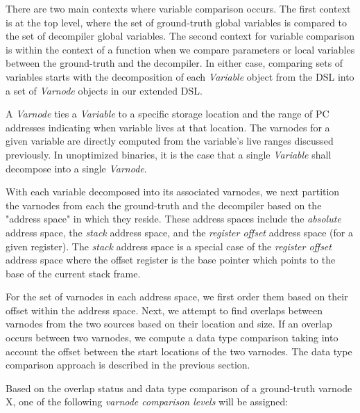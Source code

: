 \documentclass[conference]{IEEEtran}
\begin{document}
There are two main contexts where variable comparison occurs. The first context is at the top level, where the set of ground-truth global variables is compared to the set of decompiler global variables. The second context for variable comparison is within the context of a function when we compare parameters or local variables between the ground-truth and the decompiler. In either case, comparing sets of variables starts with the decomposition of each \emph{Variable} object from the DSL into a set of \emph{Varnode} objects in our extended DSL.

A \emph{Varnode} ties a \emph{Variable} to a specific storage location and the range of PC addresses indicating when variable lives at that location. The varnodes for a given variable are directly computed from the variable's live ranges discussed previously. In unoptimized binaries, it is the case that a single \emph{Variable} shall decompose into a single \emph{Varnode}.

With each variable decomposed into its associated varnodes, we next partition the varnodes from each the ground-truth and the decompiler based on the "address space" in which they reside. These address spaces include the \emph{absolute} address space, the \emph{stack} address space, and the \emph{register offset} address space (for a given register). The \emph{stack} address space is a special case of the \emph{register offset} address space where the offset register is the base pointer which points to the base of the current stack frame.

For the set of varnodes in each address space, we first order them based on their offset within the address space. Next, we attempt to find overlaps between varnodes from the two sources based on their location and size. If an overlap occurs between two varnodes, we compute a data type comparison taking into account the offset between the start locations of the two varnodes. The data type comparison approach is described in the previous section.

Based on the overlap status and data type comparison of a ground-truth varnode X, one of the following \emph{varnode comparison levels} will be assigned:
\end{document}
